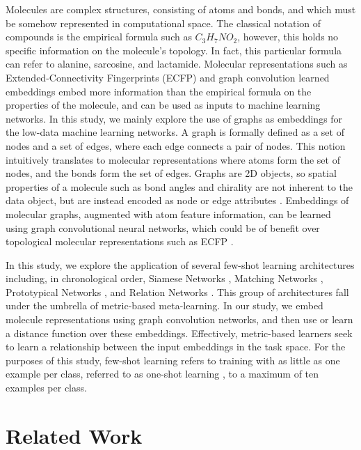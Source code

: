 Molecules are complex structures, consisting of atoms and bonds, and which must be somehow represented in computational space. The classical notation of compounds is the empirical formula such as $C_3H_7NO_2$, however, this holds no specific information on the molecule's topology. In fact, this particular formula can refer to alanine, sarcosine, and lactamide. Molecular representations such as Extended-Connectivity Fingerprints (ECFP) \cite{rogers2010extended} and graph convolution learned embeddings \cite{duvenaud2015convolutional} embed more information than the empirical formula on the properties of the molecule, and can be used as inputs to machine learning networks. In this study, we mainly explore the use of graphs as embeddings for the low-data machine learning networks. A graph is formally defined as a set of nodes and a set of edges, where each edge connects a pair of nodes. This notion intuitively translates to molecular representations where atoms form the set of nodes, and the bonds form the set of edges. Graphs are 2D objects, so spatial properties of a molecule such as bond angles and chirality are not inherent to the data object, but are instead encoded as node or edge attributes \cite{david2020molecular}. Embeddings of molecular graphs, augmented with atom feature information, can be learned using graph convolutional neural networks, which could be of benefit over topological molecular representations such as ECFP \cite{wu2018moleculenet}. 

In this study, we explore the application of several few-shot learning architectures including, in chronological order, Siamese Networks \citep{koch2015siamese}, Matching Networks \citep{vinyals2016matching}, Prototypical Networks \citep{snell2017prototypical}, and Relation Networks \citep{sung2018learning}. This group of architectures fall under the umbrella of metric-based meta-learning. In our study, we embed molecule representations using graph convolution networks, and then use or learn a distance function over these embeddings. Effectively, metric-based learners seek to learn a relationship between the input embeddings in the task space. For the purposes of this study, few-shot learning refers to training with as little as one example per class, referred to as one-shot learning \cite{koch2015siamese, vinyals2016matching}, to a maximum of ten examples per class. 

\section{Related Work}

